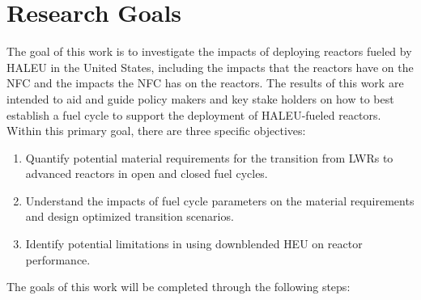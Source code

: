 \section{Research Goals}
The goal of this work is to investigate the impacts of deploying reactors 
fueled 
by \gls{HALEU} in the United States, including the impacts that the reactors 
have on the \gls{NFC} and the impacts the \gls{NFC} has on the reactors. 
The results of this work are intended to
aid and guide policy makers and key stake holders on how to best establish a 
fuel cycle to support the deployment of \gls{HALEU}-fueled reactors. 
Within this primary goal, there are three specific objectives:
\vspace{0.2cm} 
\noindent
\begin{enumerate}
\item Quantify potential material requirements for the transition 
from \glspl{LWR} to advanced reactors in open and closed 
fuel cycles.

\item Understand the impacts of fuel cycle parameters on the material 
requirements and design optimized transition scenarios.

\item Identify potential limitations in using downblended \gls{HEU} 
on reactor performance.

\end{enumerate}
The goals of this work will be completed through the following steps:
\vspace{0.2cm} 
\noindent
